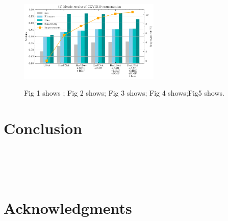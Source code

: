 \documentclass[UTF8]{article} %
\begin{document}
  \begin{figure}[ht]
    \begin{center}
    \includegraphics[width=0.6\textwidth]{cell_comparison.pdf}
    \vspace{-2mm}
    \caption{Fig 1 shows ; Fig 2 shows; Fig 3 shows; Fig 4 shows;Fig5 shows.} 
    \vspace{-2mm}
    \label{fig:cell_comparison}
    \end{center}
    \vspace{-0.35cm}
  \end{figure}
\section{Conclusion}
~\\
~\\
~\\

\section*{Acknowledgments}
~\\
~\\
~\\



\end{document}
